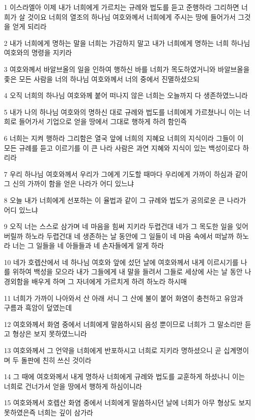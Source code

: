 \par 1 이스라엘아 이제 내가 너희에게 가르치는 규례와 법도를 듣고 준행하라 그리하면 너희가 살 것이요 너희의 열조의 하나님 여호와께서 너희에게 주시는 땅에 들어가서 그것을 얻게 되리라
\par 2 내가 너희에게 명하는 말을 너희는 가감하지 말고 내가 너희에게 명하는 너희 하나님 여호와의 명령을 지키라
\par 3 여호와께서 바알브올의 일을 인하여 행하신 바를 너희가 목도하였거니와 바알브올을 좇은 모든 사람을 너의 하나님 여호와께서 너의 중에서 진멸하셨으되
\par 4 오직 너희의 하나님 여호와께 붙어 떠나지 않은 너희는 오늘까지 다 생존하였느니라
\par 5 내가 나의 하나님 여호와의 명하신 대로 규례와 법도를 너희에게 가르쳤나니 이는 너희로 들어가서 기업으로 얻을 땅에서 그대로 행하게 하려 함인즉
\par 6 너희는 지켜 행하라 그리함은 열국 앞에 너희의 지혜요 너희의 지식이라 그들이 이 모든 규례를 듣고 이르기를 이 큰 나라 사람은 과연 지혜와 지식이 있는 백성이로다 하리라
\par 7 우리 하나님 여호와께서 우리가 그에게 기도할 때마다 우리에게 가까이 하심과 같이 그 신의 가까이 함을 얻은 나라가 어디 있느냐
\par 8 오늘 내가 너희에게 선포하는 이 율법과 같이 그 규례와 법도가 공의로운 큰 나라가 어디 있느냐
\par 9 오직 너는 스스로 삼가며 네 마음을 힘써 지키라 두렵건대 네가 그 목도한 일을 잊어버릴까 하노라 두렵건대 네 생존하는 날 동안에 그 일들이 네 마음 속에서 떠날까 하노라 너는 그 일들을 네 아들들과 네 손자들에게 알게 하라
\par 10 네가 호렙산에서 네 하나님 여호와 앞에 섰던 날에 여호와께서 내게 이르시기를 나를 위하여 백성을 모으라 내가 그들에게 내 말을 들려서 그들로 세상에 사는 날 동안 나 경외함을 배우게 하며 그 자녀에게 가르치게 하려 하노라 하시매
\par 11 너희가 가까이 나아와서 산 아래 서니 그 산에 불이 붙어 화염이 충천하고 유암과 구름과 흑암이 덮였는데
\par 12 여호와께서 화염 중에서 너희에게 말씀하시되 음성 뿐이므로 너희가 그 말소리만 듣고 형상은 보지 못하였느니라
\par 13 여호와께서 그 언약을 너희에게 반포하시고 너희로 지키라 명하셨으니 곧 십계명이며 두 돌판에 친히 쓰신 것이라
\par 14 그 때에 여호와께서 내게 명하사 너희에게 규례와 법도를 교훈하게 하셨나니 이는 너희로 건너가서 얻을 땅에서 행하게 하심이니라
\par 15 여호와께서 호렙산 화염 중에서 너희에게 말씀하시던 날에 너희가 아무 형상도 보지 못하였은즉 너희는 깊이 삼가라
